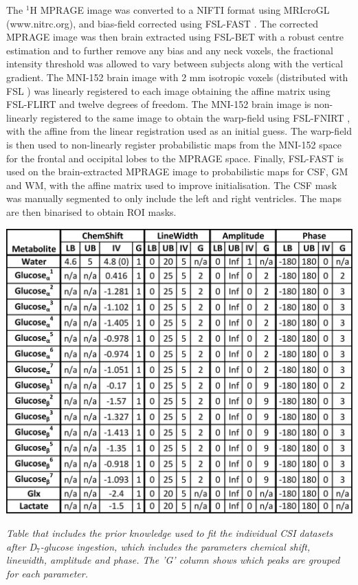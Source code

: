 The $^1$H \ac{MPRAGE} image was converted to a NIFTI format using MRIcroGL (www.nitrc.org), and bias-field corrected using FSL-FAST \cite{Zhang2001SegmentationAlgorithm}. The corrected \ac{MPRAGE} image was then brain extracted using FSL-BET \cite{Smith2002FastExtraction} with a robust centre estimation and to further remove any bias and any neck voxels, the fractional intensity threshold was allowed to vary between subjects along with the vertical gradient. The MNI-152 brain image with 2 mm isotropic voxels (distributed with FSL \cite{Smith2004AdvancesFSL}) was linearly registered to each image obtaining the affine matrix using FSL-FLIRT \cite{Jenkinson2001AImages, Jenkinson2002ImprovedImages} and twelve degrees of freedom. The MNI-152 brain image is non-linearly registered to the same image to obtain the warp-field using FSL-FNIRT \cite{AnderssonJ2008FNIRT-FMRIBsTool}, with the affine from the linear registration used as an initial guess. The warp-field is then used to non-linearly register probabilistic maps from the MNI-152 space for the frontal and occipital lobes to the \ac{MPRAGE} space. Finally, FSL-FAST \cite{Zhang2001SegmentationAlgorithm} is used on the brain-extracted \ac{MPRAGE} image to probabilistic maps for \ac{CSF}, \ac{GM} and \ac{WM}, with the affine matrix used to improve initialisation. The \ac{CSF} mask was manually segmented to only include the left and right ventricles. The maps are then binarised to obtain \ac{ROI} masks. 

\begin{table}[H]
    \centering
    \includegraphics[width = 1\textwidth]{Figures/Glucose/Prior_Table.png}
    \caption{\textit{Table that includes the prior knowledge used to fit the individual \ac{CSI} datasets after D$_7$-glucose ingestion, which includes the parameters chemical shift, linewidth, amplitude and phase. The 'G' column shows which peaks are grouped for each parameter.}}
    \label{fig:Glu:Prior}
\end{table}

